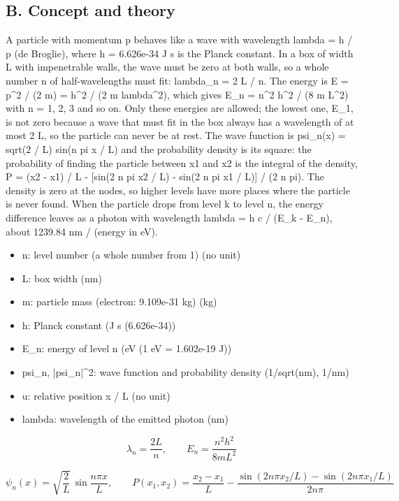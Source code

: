 \documentclass[11pt,a4paper]{article}
\begin{document}
\subsection*{B. Concept and theory}
A particle with momentum p behaves like a wave with wavelength lambda = h / p (de Broglie), where h = 6.626e-34 J s is the Planck constant. In a box of width L with impenetrable walls, the wave must be zero at both walls, so a whole number n of half-wavelengths must fit: lambda\_n = 2 L / n. The energy is E = p\textasciicircum{}2 / (2 m) = h\textasciicircum{}2 / (2 m lambda\textasciicircum{}2), which gives E\_n = n\textasciicircum{}2 h\textasciicircum{}2 / (8 m L\textasciicircum{}2) with n = 1, 2, 3 and so on. Only these energies are allowed; the lowest one, E\_1, is not zero because a wave that must fit in the box always has a wavelength of at most 2 L, so the particle can never be at rest. The wave function is psi\_n(x) = sqrt(2 / L) sin(n pi x / L) and the probability density is its square: the probability of finding the particle between x1 and x2 is the integral of the density, P = (x2 - x1) / L - [sin(2 n pi x2 / L) - sin(2 n pi x1 / L)] / (2 n pi). The density is zero at the nodes, so higher levels have more places where the particle is never found. When the particle drops from level k to level n, the energy difference leaves as a photon with wavelength lambda = h c / (E\_k - E\_n), about 1239.84 nm / (energy in eV).

\begin{itemize}[nosep]
\item n: level number (a whole number from 1) (no unit)
\item L: box width (nm)
\item m: particle mass (electron: 9.109e-31 kg) (kg)
\item h: Planck constant (J s (6.626e-34))
\item E\_n: energy of level n (eV (1 eV = 1.602e-19 J))
\item psi\_n, |psi\_n|\textasciicircum{}2: wave function and probability density (1/sqrt(nm), 1/nm)
\item u: relative position x / L (no unit)
\item lambda: wavelength of the emitted photon (nm)
\end{itemize}

\[ \lambda_n = \frac{2L}{n},\qquad E_n = \frac{n^{2} h^{2}}{8 m L^{2}} \]

\[ \psi_n(x) = \sqrt{\frac{2}{L}}\,\sin\frac{n\pi x}{L},\qquad P(x_1,x_2) = \frac{x_2 - x_1}{L} - \frac{\sin(2n\pi x_2/L) - \sin(2n\pi x_1/L)}{2n\pi} \]
\end{document}
